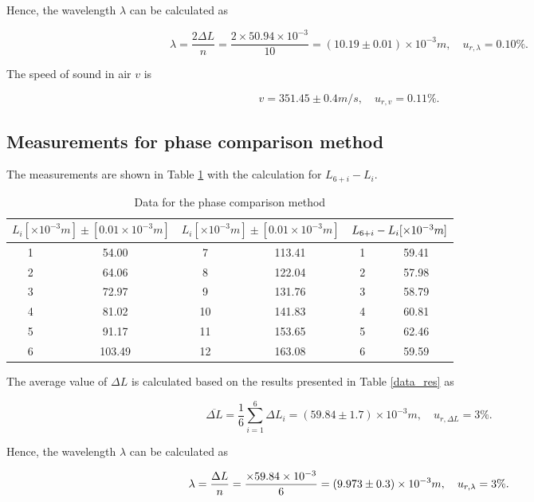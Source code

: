 Hence, the wavelength $\lambda$ can be calculated as

\[
        \lambda=\frac{2\Delta L}{n}=\frac{2\times50.94\times 10^{-3} }{10}=(10.19 \pm0.01)\times 10^{-3} m,\quad u_{r,\lambda}=0.10\%.
\]

The speed of sound in air $v$ is

\[
    v= 351.45 \pm 0.4 m/s,\quad u_{r,v}=0.11\%.
\]

\subsection{Measurements for phase comparison method}

The measurements are shown in Table \ref{data_pha} with the calculation for $L_{6+i}-L_i$.

\begin{table}[H] \small
    \centering
    \begin{tabular}{|c|c|c|c|c|c|}
    \hline
        \multicolumn{2}{|c|}{$L_i[\times 10^{-3} m]\pm[0.01\times 10^{-3} m]$} & 
        \multicolumn{2}{|c|}{$L_i[\times 10^{-3} m]\pm[0.01\times 10^{-3} m]$} &
        \multicolumn{2}{|c|}{$L_{6+i}-L_i[\times 10^{-3}m]$}\\\hline
        1 & 54.00 & 7 & 113.41 & 1 & 59.41 \\\hline
        2 & 64.06 & 8 & 122.04 & 2 & 57.98 \\\hline
        3 & 72.97 & 9 & 131.76 & 3 & 58.79 \\\hline
        4 & 81.02 & 10 & 141.83 & 4 & 60.81 \\\hline
        5 & 91.17 & 11 & 153.65 & 5 & 62.46 \\\hline
        6 & 103.49 & 12 & 163.08 & 6 & 59.59 \\\hline
    \end{tabular}
    \caption{Data for the phase comparison method}\label{data_pha}
\end{table}
    
The average value of $\Delta L$ is calculated  based on the results presented in Table \ref{data_res} as

\[
    \overline{\Delta L}=\frac{1}{6}\sum_{i=1}^{6}\Delta L_i=(59.84\pm 1.7)\times 10^{-3} m,\quad u_{r,\Delta L}=3\%.
\]

Hence, the wavelength $\lambda$ can be calculated as

\[
    \lambda=\frac{\Delta L}{n}=\frac{\times59.84\times 10^{-3}}{6}=(9.973\pm0.3)\times 10^{-3} m,\quad u_{r,\lambda}=3\%.
\]

